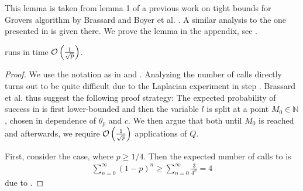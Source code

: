 This lemma is taken from lemma 1 of a previous work on tight bounds for Grovers algorithm by Brassard and Boyer et al. \cite[p. 3]{Boyer_1998}. A similar analysis to the one presented in \cite[pp. 9-10]{Brassard2000} is given there. We prove the lemma in the appendix, see .

\begin{lemma}
     runs in time \(\operatorname{\mathcal{O}}\left(\frac{1}{\sqrt{p}}\right)\).
\end{lemma}

\begin{proof}
    We use the notation as in  and . Analyzing the number of calls directly turns out to be quite difficult due to the Laplacian experiment in step . Brassard et al. thus suggest the following proof strategy: The expected probability of success in  is first lower-bounded and then the variable \(l\) is split at a point \(M_0 \in \mathbb{N}\), chosen in dependence of \(\theta_p\) and \(c\). We then argue that both until \(M_0\) is reached and afterwards, we require \(\operatorname{\mathcal{O}}\left(\frac{1}{\sqrt{p}}\right)\) applications of \(Q\).

    First, consider the case, where \(p \geq 1/4\). Then the expected number of calls to  is
    \begin{align}
        \sum_{n=0}^\infty (1-p)^n \geq \sum_{n=0}^\infty \frac{3}{4^n} = 4
    \end{align}
    due to .


\end{proof}
